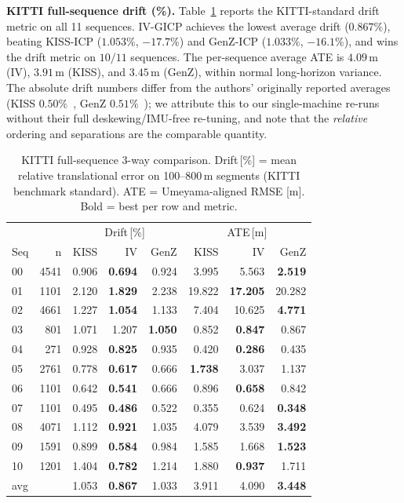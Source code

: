 \documentclass[journal,letterpaper,10pt]{IEEEtran}
\begin{document}
\textbf{KITTI full-sequence drift (\%).}
Table~\ref{tab:kitti-fullseq} reports the KITTI-standard drift metric
on all 11 sequences. IV-GICP achieves the lowest average drift
($0.867\%$), beating KISS-ICP ($1.053\%$, $-17.7\%$) and
GenZ-ICP ($1.033\%$, $-16.1\%$), and wins the drift metric on
$10/11$ sequences. The per-sequence average ATE is
$4.09$\,m (IV), $3.91$\,m (KISS), and $3.45$\,m (GenZ), within normal
long-horizon variance. The absolute drift numbers differ from the
authors' originally reported averages
(KISS $0.50\%$~\cite{vizzo2023kiss}, GenZ $0.51\%$~\cite{zhang2024genz});
we attribute this to our single-machine re-runs without their full
deskewing/IMU-free re-tuning, and note that the \emph{relative}
ordering and separations are the comparable quantity.

\begin{table}[h]
\centering
\scriptsize
\setlength{\tabcolsep}{3pt}
\caption{KITTI full-sequence 3-way comparison. Drift\,[\%] = mean
relative translational error on 100--800\,m segments (KITTI benchmark
standard). ATE = Umeyama-aligned RMSE [m]. Bold = best per row and
metric.}
\label{tab:kitti-fullseq}
\begin{tabular}{l r | r r r | r r r}
\toprule
 & & \multicolumn{3}{c|}{Drift\,[\%]} & \multicolumn{3}{c}{ATE\,[m]} \\
Seq & n & KISS & IV & GenZ & KISS & IV & GenZ \\
\midrule
00 & 4541 & 0.906 & \textbf{0.694} & 0.924 & 3.995 & 5.563 & \textbf{2.519} \\
01 & 1101 & 2.120 & \textbf{1.829} & 2.238 & 19.822 & \textbf{17.205} & 20.282 \\
02 & 4661 & 1.227 & \textbf{1.054} & 1.133 & 7.404 & 10.625 & \textbf{4.771} \\
03 &  801 & 1.071 & 1.207 & \textbf{1.050} & 0.852 & \textbf{0.847} & 0.867 \\
04 &  271 & 0.928 & \textbf{0.825} & 0.935 & 0.420 & \textbf{0.286} & 0.435 \\
05 & 2761 & 0.778 & \textbf{0.617} & 0.666 & \textbf{1.738} & 3.037 & 1.137 \\
06 & 1101 & 0.642 & \textbf{0.541} & 0.666 & 0.896 & \textbf{0.658} & 0.842 \\
07 & 1101 & 0.495 & \textbf{0.486} & 0.522 & 0.355 & 0.624 & \textbf{0.348} \\
08 & 4071 & 1.112 & \textbf{0.921} & 1.035 & 4.079 & 3.539 & \textbf{3.492} \\
09 & 1591 & 0.899 & \textbf{0.584} & 0.984 & 1.585 & 1.668 & \textbf{1.523} \\
10 & 1201 & 1.404 & \textbf{0.782} & 1.214 & 1.880 & \textbf{0.937} & 1.711 \\
\midrule
avg & & 1.053 & \textbf{0.867} & 1.033 & 3.911 & 4.090 & \textbf{3.448} \\
\bottomrule
\end{tabular}
\end{table}
\end{document}
